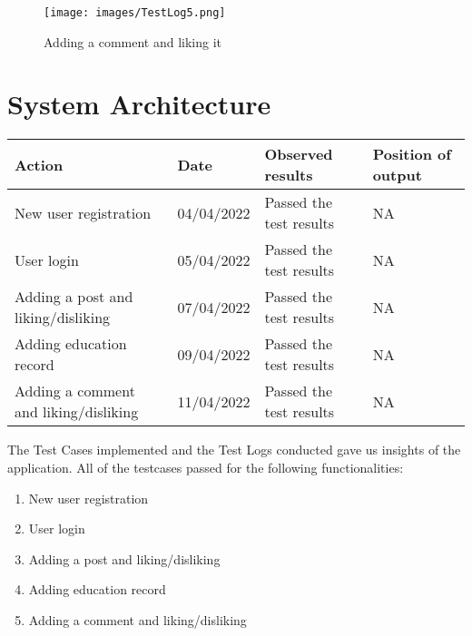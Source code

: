 \documentclass[12pt]{article}
\begin{document}
\begin{figure}[H] 
    \centering
    \texttt{[image: images/TestLog5.png]}
    \caption{Adding a comment and liking it}
\end{figure}

\pagebreak

\section{System Architecture}
\begin{center}
\begin{longtable}{ | p{4cm} | p{4cm} | p{4cm} | p{4cm} | }
\hline
	\textbf{Action} & \textbf{Date} & \textbf{Observed results} & \textbf{Position of output}\\
\hline
	New user registration & 04/04/2022 & Passed the test results & NA \\
\hline
	User login& 05/04/2022 & Passed the test results & NA \\
\hline
	Adding a post and liking/disliking & 07/04/2022 & Passed the test results & NA \\
\hline
	Adding education record & 09/04/2022 & Passed the test results & NA \\
\hline
	Adding a comment and liking/disliking & 11/04/2022 & Passed the test results & NA \\
\hline
	\end{longtable}
\end{center}
The Test Cases implemented and the Test Logs conducted gave us insights of the application. All of the testcases passed for the following functionalities:
\begin{enumerate}
	\item New user registration
	\item User login
	\item Adding a post and liking/disliking
	\item Adding education record
\item Adding a comment and liking/disliking
\end{enumerate}
\end{document}
